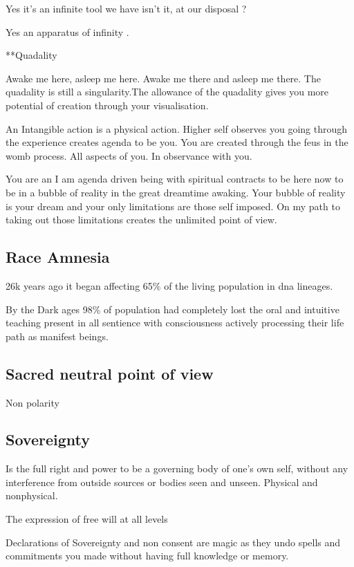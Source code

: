 Yes it's an infinite tool we have isn't it, at our disposal ?

Yes an apparatus of infinity .

**Quadality

Awake me here, asleep me here. Awake me there and asleep me there. The
quadality is still a singularity.The allowance of the quadality gives
you more potential of creation through your visualisation.

An Intangible action is a physical action. Higher self observes you
going through the experience creates agenda to be you. You are created
through the feus in the womb process. All aspects of you. In observance
with you.

You are an I am agenda driven being with spiritual contracts to be here
now to be in a bubble of reality in the great dreamtime awaking. Your
bubble of reality is your dream and your only limitations are those self
imposed. On my path to taking out those limitations creates the
unlimited point of view.

\subsection{Race Amnesia}\label{race-amnesia}

26k years ago it began affecting 65\% of the living population in dna
lineages.

By the Dark ages 98\% of population had completely lost the oral and
intuitive teaching present in all sentience with consciousness actively
processing their life path as manifest beings.

\subsection{Sacred neutral point of
view}\label{sacred-neutral-point-of-view}

Non polarity

\subsection{Sovereignty}\label{sovereignty}

Is the full right and power to be a governing body of one's own self,
without any interference from outside sources or bodies seen and unseen.
Physical and nonphysical.

The expression of free will at all levels

Declarations of Sovereignty and non consent are magic as they undo
spells and commitments you made without having full knowledge or memory.

